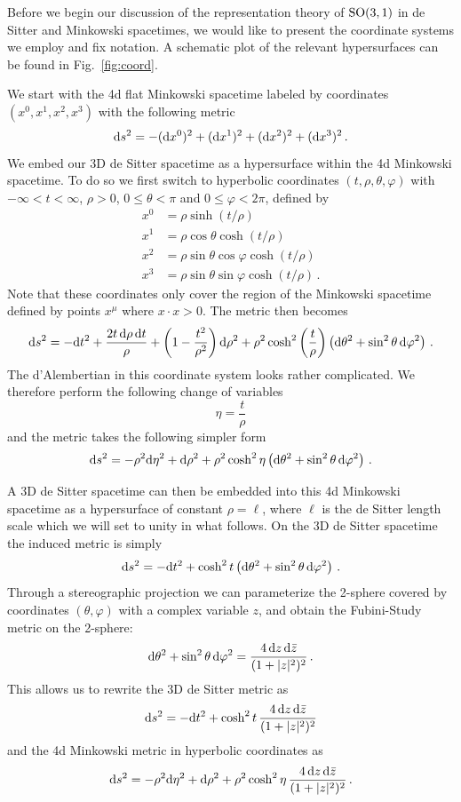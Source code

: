 \documentclass{brownthesis}
\def\dd{{\rm d}}
\begin{document}
Before we begin our discussion of the representation theory of ${\rm SO(3,1)}$
in de Sitter and Minkowski spacetimes, we would like to present the
coordinate systems we employ and fix notation. A schematic plot of
the relevant hypersurfaces can be found in Fig.~\ref{fig:coord}.

We start with the 4d flat Minkowski spacetime labeled by coordinates
$(x^{0},x^{1},x^{2},x^{3})$ with the following metric
\[
\dd s^{2}=-(\dd x^{0})^{2}+(\dd x^{1})^{2}+(\dd x^{2})^{2}+(\dd x^{3})^{2}\,.
\]
We embed our 3D de Sitter spacetime as a hypersurface within the 4d
Minkowski spacetime. To do so we first switch to hyperbolic coordinates
$(t,\rho,\theta,\varphi)$ with $-\infty<t<\infty$, $\rho>0$, $0\le\theta<\pi$
and $0\le\varphi<2\pi$, defined by
\begin{align}
x^{0} & =\rho\sinh(t/\rho)\nonumber \\
x^{1} & =\rho\cos\theta\cosh(t/\rho)\nonumber \\
x^{2} & =\rho\sin\theta\cos\varphi\cosh(t/\rho)\nonumber \\
x^{3} & =\rho\sin\theta\sin\varphi\cosh(t/\rho)\,.\label{eq:embedding}
\end{align}
Note that these coordinates only cover the region of the Minkowski
spacetime defined by points $x^{\mu}$ where $x\cdot x>0$. The metric
then becomes
\[
\dd s^{2}=-\dd t^{2}+\frac{2t\,\dd\rho\,\dd t}{\rho}+\left(1-\frac{t^{2}}{\rho^{2}}\right)\dd\rho^{2}+\rho^{2}\cosh^{2}\left(\frac{t}{\rho}\right)\left(\dd\theta^{2}+\sin^{2}\theta\,\dd\varphi^{2}\right)\,.
\]
The d'Alembertian in this coordinate system looks rather complicated.
We therefore perform the following change of variables
\[
\eta=\frac{t}{\rho}
\]
and the metric takes the following simpler form
\[
\dd s^{2}=-\rho^{2}\dd\eta^{2}+\dd\rho^{2}+\rho^{2}\cosh^{2}\eta\left(\dd\theta^{2}+\sin^{2}\theta\,\dd\varphi^{2}\right)\,.
\]

A 3D de Sitter spacetime can then be embedded into this 4d Minkowski
spacetime as a hypersurface of constant $\rho=\ell$, where $\ell$
is the de Sitter length scale which we will set to unity in what follows.
On the 3D de Sitter spacetime the induced metric is simply
\[
\dd s^{2}=-\dd t^{2}+\cosh^{2}t\left(\dd\theta^{2}+\sin^{2}\theta\,\dd\varphi^{2}\right)\,.
\]
Through a stereographic projection we can parameterize the 2-sphere
covered by coordinates $(\theta,\varphi)$ with a complex variable
$z$, and obtain the Fubini-Study metric on the 2-sphere:
\[
\dd\theta^{2}+\sin^{2}\theta\,\dd\varphi^{2}=\frac{4\,\dd z\,\dd\bar{z}}{(1+|z|^{2})^{2}}\,.
\]
This allows us to rewrite the 3D de Sitter metric as
\begin{equation}
\dd s^{2}=-\dd t^{2}+\cosh^{2}t\,\frac{4\,\dd z\,\dd\bar{z}}{(1+|z|^{2})^{2}}\label{eq:3dds}
\end{equation}
and the 4d Minkowski metric in hyperbolic coordinates as
\[
\dd s^{2}=-\rho^{2}\dd\eta^{2}+\dd\rho^{2}+\rho^{2}\cosh^{2}\eta\,\frac{4\,\dd z\,\dd\bar{z}}{(1+|z|^{2})^{2}}\,.
\]
\end{document}
